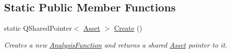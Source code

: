 \subsection*{Static Public Member Functions}
\begin{DoxyCompactItemize}
\item 
\hypertarget{class_picto_1_1_analysis_function_a23b2097c84ca4d7366301be4447f6479}{static Q\-Shared\-Pointer$<$ \hyperlink{class_picto_1_1_asset}{Asset} $>$ \hyperlink{class_picto_1_1_analysis_function_a23b2097c84ca4d7366301be4447f6479}{Create} ()}\label{class_picto_1_1_analysis_function_a23b2097c84ca4d7366301be4447f6479}

\begin{DoxyCompactList}\small\item\em Creates a new \hyperlink{class_picto_1_1_analysis_function}{Analysis\-Function} and returns a shared \hyperlink{class_picto_1_1_asset}{Asset} pointer to it. \end{DoxyCompactList}\end{DoxyCompactItemize}
